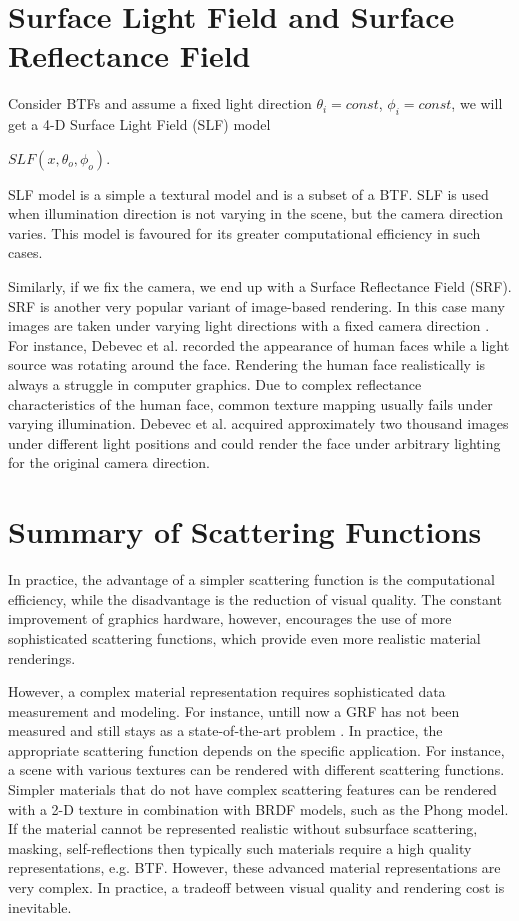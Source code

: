  
\section{Surface Light Field and Surface Reflectance Field}
\label{section:slf}
Consider BTFs and assume a fixed light direction $\theta_{i} = const$, $\phi_{i}=const$, we will get a 4-D Surface Light Field (SLF) model 


 \begin{center}
$SLF(x,\theta_{o} ,\phi_{o})$.
 \end{center}
 
 SLF model is a simple a textural model and is a subset of a BTF. 
 SLF is used when illumination direction is not varying in the scene, but the camera direction varies.
This model is favoured for its greater computational efficiency in such cases.


Similarly, if we fix the camera, we end up with a Surface Reflectance Field (SRF).
 SRF is another very popular variant of image-based rendering. 
 In this case many images are taken under varying light directions with a fixed camera direction \cite{star2004}. 
 For instance, Debevec et al. \cite{debevec} recorded the appearance of human faces while a
light source was rotating around the face. Rendering the human face realistically is always a struggle in computer graphics.
Due to complex reflectance characteristics of the human face, common texture mapping usually fails under varying illumination.
 Debevec et al. acquired approximately two thousand images under different light positions and could render the face under arbitrary lighting for the original camera direction. 


\section{Summary of Scattering Functions}
\label{section:attrib}
In practice, the advantage of a simpler scattering function is the computational efficiency, 
while the disadvantage is the reduction of visual quality. 
The constant improvement of graphics hardware, however, encourages the use of more sophisticated scattering functions, which provide even more realistic material renderings. 
 
However, a complex material representation requires sophisticated data measurement and modeling.
For instance, untill now a GRF has not been measured and still stays as a state-of-the-art problem \cite{haindl_visual}.
In practice, the appropriate scattering function depends on the specific application.
For instance, a scene with various textures can be rendered with different scattering functions. 
Simpler materials that do not have complex scattering features can be rendered with a 2-D texture in combination with BRDF models, such as the Phong model.
If the material cannot be represented realistic without subsurface scattering, masking, self-reflections then typically such materials require a high quality representations, e.g. BTF.
However, these advanced material representations are very complex.
In practice, a tradeoff between visual quality and rendering cost is inevitable. 




